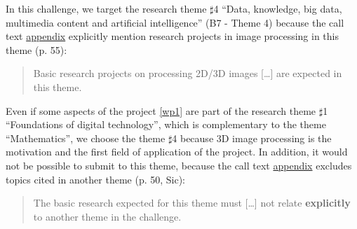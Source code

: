 
In this challenge, we target the research theme $\sharp$4 
``Data,  knowledge,  big  data,  multimedia  content  and  artificial 
intelligence'' (B7 - Theme 4) because the call text 
\href{http://www.agence-nationale-recherche.fr/fileadmin/documents/2017/ANR-Work-Programme-2018-Appendix.pdf}{appendix}
explicitly mention research projects in image processing in this theme (p. 55):
\begin{quote}
Basic research projects on processing 2D/3D
images [\ldots] are expected in this theme.
\end{quote}


Even if some aspects of the project \ref{wp1} are part of the research theme $\sharp$1
``Foundations of digital technology'', which is complementary to the theme ``Mathematics'',
we choose the theme $\sharp$4 because 3D image processing is the motivation and the
first field of application of the project. In addition, it would not be possible to
submit to this theme, because the call text
\href{http://www.agence-nationale-recherche.fr/fileadmin/documents/2017/ANR-Work-Programme-2018-Appendix.pdf}{appendix}
excludes topics cited in another theme (p. 50, Sic): 
\begin{quote}
The basic research  expected  for this theme must [\ldots] not relate \textbf{explicitly}
to  another theme in the challenge.
\end{quote}




